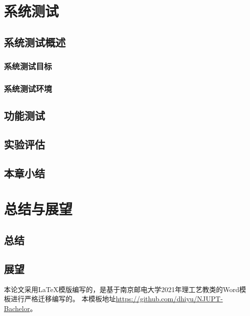 \documentclass[bachelor]{njupthesis}
\begin{document}
\chapter{系统测试}
\section{系统测试概述}
\subsection{系统测试目标}
\subsection{系统测试环境}
\section{功能测试}
\section{实验评估}
\section{本章小结}


\chapter{总结与展望}
\section{总结}
\section{展望}



\thesisacknowledgement

本论文采用\LaTeX 模版编写的，是基于南京邮电大学2021年理工艺教类的Word模板进行严格迁移编写的。
本模板地址\url{https://github.com/dhiyu/NJUPT-Bachelor}。

\thesisreference
\end{document}
